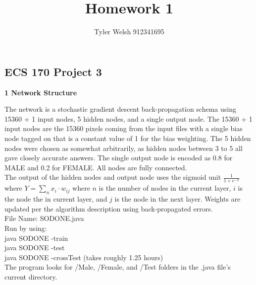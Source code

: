 \documentclass[11pt]{article}  %
\title{\textbf{Homework 1}}
\author{Tyler Welsh 912341695}
\date{}
\begin{document}
\thispagestyle{first}
\begin{center}
\section*{ECS 170 Project 3}
\end{center}

\Large{\textbf{1 Network Structure}}
\normalsize

The network is a stochastic gradient descent back-propagation schema using 15360 + 1 input nodes, 5 hidden nodes, and a single output node. The 15360 + 1 input nodes are the 15360 pixels coming from the input files with a single bias node tagged on that is a constant value of 1 for the bias weighting. The 5 hidden nodes were chosen as somewhat arbitrarily, as hidden nodes between 3 to 5 all gave closely accurate answers. The single output node is encoded as 0.8 for MALE and 0.2 for FEMALE. All nodes are fully connected.\\
The output of the hidden nodes and output node uses the sigmoid unit $\frac{1}{1+e^{-Y}}$ where $Y = \sum_n x_i \cdot w_{ij}$ where $n$ is the number of nodes in the current layer, $i$ is the node the in current layer, and $j$ is the node in the next layer. Weights are updated per the algorithm description using back-propagated errors.\\
File Name: SODONE.java\\
Run by using:\\
java SODONE -train\\
java SODONE -test\\
java SODONE -crossTest (takes roughly 1.25 hours)\\
The program looks for /Male, /Female, and /Test folders in the .java file's current directory.
\end{document}
